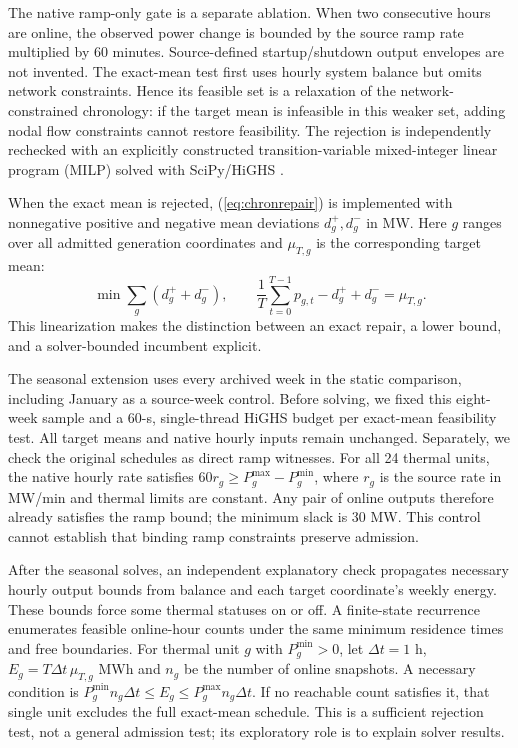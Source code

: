 \documentclass[journal]{IEEEtran}
\begin{document}
The native ramp-only gate is a separate ablation. When two consecutive hours are online, the observed power change is bounded by the source ramp rate multiplied by 60 minutes. Source-defined startup/shutdown output envelopes are not invented. The exact-mean test first uses hourly system balance but omits network constraints. Hence its feasible set is a relaxation of the network-constrained chronology: if the target mean is infeasible in this weaker set, adding nodal flow constraints cannot restore feasibility. The rejection is independently rechecked with an explicitly constructed transition-variable mixed-integer linear program (MILP) solved with SciPy/HiGHS \cite{Virtanen2020,Huangfu2018}.

When the exact mean is rejected, (\ref{eq:chronrepair}) is implemented with nonnegative positive and negative mean deviations $d_g^+,d_g^-$ in MW. Here $g$ ranges over all admitted generation coordinates and $\mu_{T,g}$ is the corresponding target mean:
\begin{equation}
\min\sum_g(d_g^++d_g^-),\qquad
\frac{1}{T}\sum_{t=0}^{T-1} p_{g,t}-d_g^++d_g^-=\mu_{T,g}.
\label{eq:repairlin}
\end{equation}
This linearization makes the distinction between an exact repair, a lower bound, and a solver-bounded incumbent explicit.

The seasonal extension uses every archived week in the static comparison, including January as a source-week control. Before solving, we fixed this eight-week sample and a 60-s, single-thread HiGHS budget per exact-mean feasibility test. All target means and native hourly inputs remain unchanged. Separately, we check the original schedules as direct ramp witnesses. For all 24 thermal units, the native hourly rate satisfies $60r_g\ge P_g^{\max}-P_g^{\min}$, where $r_g$ is the source rate in MW/min and thermal limits are constant. Any pair of online outputs therefore already satisfies the ramp bound; the minimum slack is 30 MW. This control cannot establish that binding ramp constraints preserve admission.

After the seasonal solves, an independent explanatory check propagates necessary hourly output bounds from balance and each target coordinate's weekly energy. These bounds force some thermal statuses on or off. A finite-state recurrence enumerates feasible online-hour counts under the same minimum residence times and free boundaries. For thermal unit $g$ with $P_g^{\min}>0$, let $\Delta t=1$ h, $E_g=T\Delta t\,\mu_{T,g}$ MWh and $n_g$ be the number of online snapshots. A necessary condition is $P_g^{\min}n_g\Delta t\le E_g\le P_g^{\max}n_g\Delta t$. If no reachable count satisfies it, that single unit excludes the full exact-mean schedule. This is a sufficient rejection test, not a general admission test; its exploratory role is to explain solver results.
\end{document}
